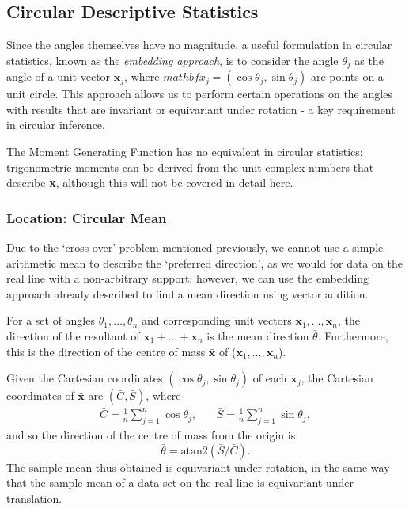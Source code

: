 \documentclass[../../ArchStats.tex]{subfiles}
\begin{document}


\subsection{Circular Descriptive Statistics}
\label{sec:circular-descriptives}

Since the angles themselves have no magnitude, a useful formulation in circular statistics, known as the \textit{embedding approach}, is to consider the angle $\theta_j$ as the angle of a unit vector $\mathbf{x}_j$, where $mathbf{x}_j = (\cos\theta_j, \sin\theta_j)$ are points on a unit circle. This approach allows us to perform certain operations on the angles with results that are invariant or equivariant under rotation - a key requirement in circular inference.

The Moment Generating Function  has no equivalent in circular statistics; trigonometric moments can be derived from the unit complex numbers that describe \textbf{x}, although this will not be covered in detail here.

\subsubsection{Location: Circular Mean}
\label{sec:circ-mean}

Due to the `cross-over' problem mentioned previously, we cannot use a simple arithmetic mean to describe the `preferred direction', as we would for data on the real line with a non-arbitrary support; however, we can use the embedding approach already described to find a mean direction using vector addition.

For a set of angles $\theta_1, \dots, \theta_n$ and corresponding unit vectors $\mathbf{x}_1, \dots, \mathbf{x}_n$, the direction of the resultant of $\mathbf{x}_1 + \dots + \mathbf{x}_n$ is the mean direction $\bar{\theta}$. Furthermore, this is the direction of the centre of mass $\mathbf{\bar{x}}$ of ($\mathbf{x}_1, \dots, \mathbf{x}_n$).

Given the Cartesian coordinates $(\cos\theta_j, \sin\theta_j)$ of each $\mathbf{x}_j$, the Cartesian coordinates of $\mathbf{\bar{x}}$ are $(\bar{C}, \bar{S})$, where
	\begin{equation}
	\label{eqn:C-and-S}
	\begin{matrix*}
	\bar{C} = \frac{1}{n} \sum_{j=1}^{n} \cos \theta_j, & \, & 
	\bar{S} = \frac{1}{n} \sum_{j=1}^{n} \sin \theta_j,
	\end{matrix*}
	\end{equation}
and so the direction of the centre of mass from the origin is 
\begin{equation}
\label{eqn:circ-mean}
\bar{\theta} = \text{atan2}(\bar{S}/\bar{C}).
\end{equation}
The sample mean thus obtained is equivariant under rotation, in the same way that the sample mean of a data set on the real line is equivariant under translation.
\end{document}
